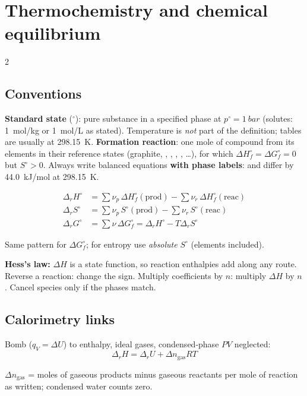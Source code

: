 \section{Thermochemistry and chemical equilibrium}\label{sec:thermochem}
\begin{multicols}{2}
\subsection{Conventions}\label{sec:stdstate}
\CORE{} \textbf{Standard state} ($^\circ$): pure substance in a specified phase at $p^\circ=\SI{1}{bar}$ (solutes: \SI{1}{mol/kg} or \SI{1}{mol/L} as stated). Temperature is \emph{not} part of the definition; tables are usually at \SI{298.15}{K}. \textbf{Formation reaction}: one mole of compound from its elements in their reference states (graphite, , , , , \ldots), for which $\Delta H_f^\circ=\Delta G_f^\circ=0$ but $S^\circ>0$. Always write balanced equations \textbf{with phase labels}:  and  differ by \SI{44.0}{kJ/mol} at \SI{298.15}{K}.

\begin{formulabox}
\vspace{-6pt}
\begin{align}
\Delta_rH^\circ &= \textstyle\sum\nu_p\,\Delta H_f^\circ(\text{prod})-\sum\nu_r\,\Delta H_f^\circ(\text{reac}) \label{F:thermo:formation}\\
\Delta_rS^\circ &= \textstyle\sum\nu_p\,S^\circ(\text{prod})-\sum\nu_r\,S^\circ(\text{reac}) \label{F:thermo:entropy}\\
\Delta_rG^\circ &= \textstyle\sum\nu\,\Delta G_f^\circ = \Delta_rH^\circ-T\Delta_rS^\circ \label{F:thermo:gibbs}
\end{align}
\end{formulabox}
Same pattern for $\Delta G_f^\circ$; for entropy use \emph{absolute} $S^\circ$ (elements included).

\textbf{Hess's law:} $\Delta H$ is a state function, so reaction enthalpies add along any route. Reverse a reaction: change the sign. Multiply coefficients by $n$: multiply $\Delta H$ by $n$. Cancel species only if the phases match.

\subsection{Calorimetry links}\label{sec:thermocal}
\begin{formulabox}Bomb ($q_V=\Delta U$) to enthalpy, ideal gases, condensed-phase $PV$ neglected:
\begin{equation}
\Delta_rH=\Delta_rU+\Delta n_{\text{gas}}RT \label{F:thermo:bomb}
\end{equation}
\end{formulabox}
$\Delta n_{\text{gas}}$ = moles of gaseous products minus gaseous reactants per mole of reaction as written; condensed water counts zero.


\end{multicols}
